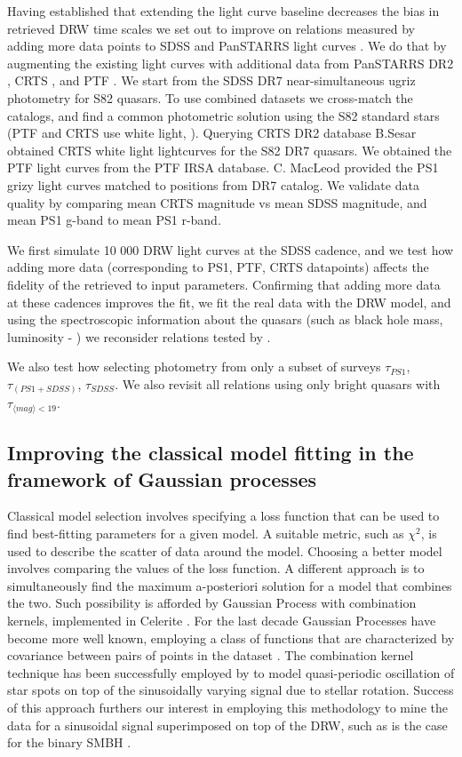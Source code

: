 \documentclass[modern]{aastex62}
\begin{document}
Having established that extending the light curve baseline decreases the bias in retrieved DRW time scales we set out to improve on relations measured by \cite{macleod2011, hernitschek2016} adding more data points to SDSS and PanSTARRS light curves \citep{chambers2011}. We do that by augmenting the existing light curves with additional data from PanSTARRS DR2 \citep{flewelling2018} , CRTS \citep{drake2009}, and PTF \citep{rau2009}.  We start from the SDSS  DR7 near-simultaneous ugriz photometry for S82 quasars\citep{schneider2008}.  To use combined datasets we cross-match the catalogs, and find a common photometric solution using the S82 standard stars (PTF and CRTS use white light, \cite{djorgovski2011a}). Querying CRTS DR2 database B.Sesar obtained CRTS white light lightcurves for the S82 DR7 quasars.  We obtained the PTF light curves from the PTF IRSA database.  C. MacLeod provided  the PS1  grizy  light curves matched to positions from DR7 catalog.  We validate data quality by comparing mean CRTS magnitude vs mean SDSS magnitude, and mean PS1 g-band to mean PS1 r-band. 

We first simulate 10 000 DRW light curves at the SDSS cadence, and we test how adding more data (corresponding to PS1, PTF, CRTS datapoints) affects the fidelity of the retrieved to input parameters. Confirming that adding more data at these cadences improves the fit, we fit the real data with the DRW model, and using the spectroscopic information about the quasars (such as black hole mass, luminosity - \cite{kelly2013}) we reconsider relations tested by \cite{macleod2011}. 

We also test how selecting photometry from only a subset of surveys $\tau_{PS1}$, $\tau_{(PS1+SDSS)}$,  $\tau_{SDSS}$.  We also revisit all relations using only bright quasars with   $\tau_{\langle mag\rangle<19}$.

\subsection{Improving the classical model fitting in the  framework of Gaussian processes}

Classical model selection involves specifying a loss function that can be used to find best-fitting parameters for a given model. A suitable metric, such as $\chi^{2}$, is used to  describe the scatter of data around the model. Choosing a better model involves comparing the values of the loss function. A different approach is to simultaneously find the maximum a-posteriori solution for a model that combines the two. Such possibility is afforded by Gaussian Process with combination kernels,  implemented in Celerite  \citep{foreman2017}. For the last decade Gaussian Processes have become more well known, employing a class of functions that  are characterized by covariance between pairs of points in the dataset \citep{foreman2017}.  The combination kernel technique has been successfully employed by  \cite{angus2018}  to model  quasi-periodic oscillation of star spots on top of the sinusoidally varying signal due to stellar rotation. Success of this approach furthers our interest in employing this methodology to mine the data for a sinusoidal signal superimposed on top of the DRW, such as is the case for the binary SMBH \citep{charisi2018}. 
\end{document}

